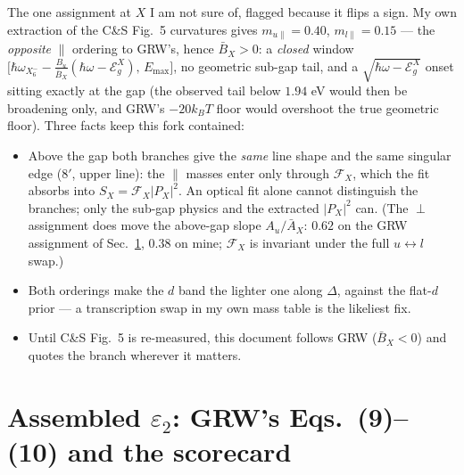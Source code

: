 \documentclass[11pt,a4paper]{article}
\numberwithin{equation}{section}
\newcommand{\hw}{\hbar\omega}
\newcommand{\EgX}{\mathcal{E}_g^{X}}
\newcommand{\cF}{\mathcal{F}}
\newcommand{\Ab}{\bar{A}}
\newcommand{\Bb}{\bar{B}}
\newcommand{\eps}{\varepsilon}
\newcommand{\wXu}{\hbar\omega_{X_6^-}}
\newcommand{\kB}{k_B}
\begin{document}
The one assignment at $X$ I am not sure of, flagged because it flips a
sign.  My own extraction of the C\&S Fig.~5 curvatures gives
$m_{u\parallel}=0.40$, $m_{l\parallel}=0.15$ --- the \emph{opposite}
$\parallel$ ordering to GRW's, hence $\Bb_X>0$: a \emph{closed} window
$\bigl[\wXu-\tfrac{B_u}{\Bb_X}(\hw-\EgX),\,E_{\max}\bigr]$, no
geometric sub-gap tail, and a $\sqrt{\hw-\EgX}$ onset sitting exactly
at the gap (the observed tail below $1.94$ eV would then be broadening
only, and GRW's $-20\kB T$ floor would overshoot the true geometric
floor).  Three facts keep this fork contained:
\begin{itemize}
\item Above the gap both branches give the \emph{same} line shape and
      the same singular edge ($8'$, upper line): the $\parallel$
      masses enter only through $\cF_X$, which the fit absorbs into
      $S_X=\cF_X|P_X|^2$.  An optical fit alone cannot distinguish the
      branches; only the sub-gap physics and the extracted $|P_X|^2$
      can.  (The $\perp$ assignment does move the above-gap slope
      $A_u/\Ab_X$: $0.62$ on the GRW assignment of
      Sec.~\ref{sec:eps2}, $0.38$ on mine; $\cF_X$ is invariant under
      the full $u\leftrightarrow l$ swap.)
\item Both orderings make the $d$ band the lighter one along
      $\Delta$, against the flat-$d$ prior --- a transcription swap in
      my own mass table is the likeliest fix.
\item Until C\&S Fig.~5 is re-measured, this document follows GRW
      ($\Bb_X<0$) and quotes the branch wherever it matters.
\end{itemize}

\section{Assembled $\eps_2$: GRW's Eqs.\ (9)--(10) and the scorecard}
\label{sec:eps2}
\end{document}
